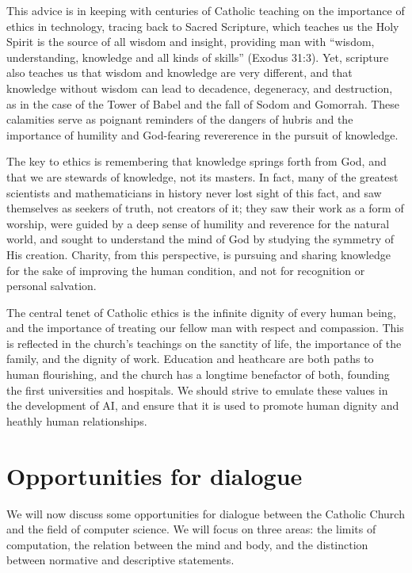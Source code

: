 \documentclass[sigplan,nonacm]{acmart}\settopmatter{printfolios=false,printccs=false,printacmref=false}
\begin{document}
  This advice is in keeping with centuries of Catholic teaching on the importance of ethics in technology, tracing back to Sacred Scripture, which teaches us the Holy Spirit is the source of all wisdom and insight, providing man with ``wisdom, understanding, knowledge and all kinds of skills'' (Exodus 31:3). Yet, scripture also teaches us that wisdom and knowledge are very different, and that knowledge without wisdom can lead to decadence, degeneracy, and destruction, as in the case of the Tower of Babel and the fall of Sodom and Gomorrah. These calamities serve as poignant reminders of the dangers of hubris and the importance of humility and God-fearing revererence in the pursuit of knowledge.

  The key to ethics is remembering that knowledge springs forth from God, and that we are stewards of knowledge, not its masters. In fact, many of the greatest scientists and mathematicians in history never lost sight of this fact, and saw themselves as seekers of truth, not creators of it; they saw their work as a form of worship, were guided by a deep sense of humility and reverence for the natural world, and sought to understand the mind of God by studying the symmetry of His creation. Charity, from this perspective, is pursuing and sharing knowledge for the sake of improving the human condition, and not for recognition or personal salvation.

  The central tenet of Catholic ethics is the infinite dignity of every human being, and the importance of treating our fellow man with respect and compassion. This is reflected in the church's teachings on the sanctity of life, the importance of the family, and the dignity of work. Education and heathcare are both paths to human flourishing, and the church has a longtime benefactor of both, founding the first universities and hospitals. We should strive to emulate these values in the development of AI, and ensure that it is used to promote human dignity and heathly human relationships.

  \section{Opportunities for dialogue}

  We will now discuss some opportunities for dialogue between the Catholic Church and the field of computer science. We will focus on three areas: the limits of computation, the relation between the mind and body, and the distinction between normative and descriptive statements.
\end{document}
